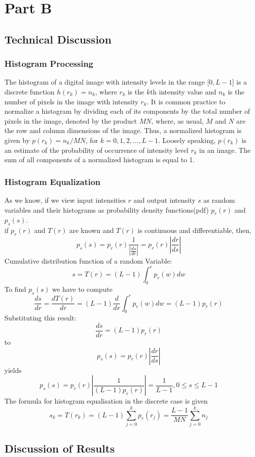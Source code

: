 \section{Part B}
\subsection{Technical Discussion}
\subsubsection{Histogram Processing}
The histogram of a digital image with intensity levels in the range [$0, L - 1$] is a discrete function $h(r_k) = n_k$, where $r_k$ is the $k$th intensity value and $n_k$ is the number of pixels in the image with intensity $r_k$. It is common practice to normalize a histogram by dividing each of its components by the total number of pixels in the image, denoted by the product $MN$, where, as usual, $M$ and $N$ are the row and column dimensions of the image. Thus, a normalized histogram is given by $p(r_k) = n_k/MN$, for $k = 0, 1, 2, ..., L-1$. Loosely speaking, $p(r_k)$ is an estimate of the probability of occurrence of intensity level $r_k$ in an image. The sum of all components of a normalized histogram is equal to 1.
\subsubsection{Histogram Equalization}
As we know, if we view input intensities $r$ and output intensity $s$ as random variables and their histograms as probability density functions(pdf) $p_r(r)$ and $p_s(s)$.\\
if $p_r(r)$ and $T(r)$ are known and $T(r)$ is continuous and differentiable, then,
$$ p_s(s) = p_r(r)\frac{1}{\left| \frac{ds}{dr} \right|} = p_r(r)\left| \frac{dr}{ds} \right| $$ 
Cumulative distribution function of a random Variable:
$$s = T(r) = (L - 1)\int_0^r p_r(w)dw$$
To find $p_s(s)$ we have to compute
$$ \frac{ds}{dr} = \frac{dT(r)}{dr} = (L - 1)\frac{d}{dr}\int_0^r p_r(w)dw = (L - 1)p_r(r) $$
Substituting this result:
$$ \frac{ds}{dr} = (L - 1)p_r(r) $$
to 
$$ p_s(s) = p_r(r)\left| \frac{dr}{ds} \right| $$
yields
$$p_s(s) = p_r(r)\left| \frac{1}{(L - 1)p_r(r)} \right| = \frac{1}{L - 1} , 0 \leq s \leq L - 1 $$
The formula for histogram equalisation in the discrete case is given
$$ s_k = T(r_k) = (L - 1)\sum_{j = 0}^k p_r(r_j) = \frac{L - 1}{MN}\sum_{j = 0}^{k} n_j $$
\subsection{Discussion of Results}
